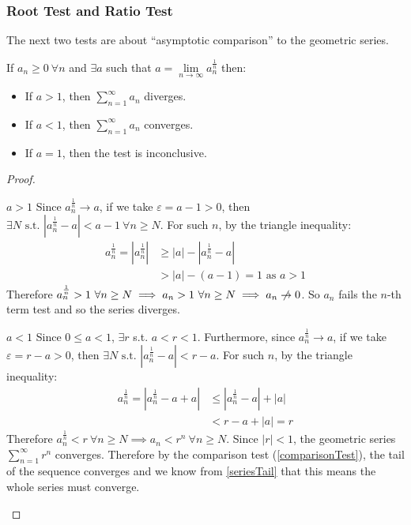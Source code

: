 \documentclass[../main.tex]{subfiles}
\begin{document}
\subsubsection{Root Test and Ratio Test}
The next two tests are about ``asymptotic comparison'' to the geometric series.
\begin{proposition}
  If $a_n \geq 0\ \forall n$ and $\exists a$ such that $a = \lim\limits_{n \to \infty} a^{\frac{1}{n}}_{n}$ then:
  \label{rootTest}
  \begin{itemize}
    \item If $a > 1$, then $\sum_{n = 1}^{\infty} a_n$ diverges.
    \item If $a < 1$, then $\sum_{n = 1}^{\infty} a_n$ converges.
    \item If $a = 1$, then the test is inconclusive.
  \end{itemize}
\end{proposition}
\begin{proof}
  \begin{proofcases}
    \begin{case}{$a > 1$}
      Since $a^{\frac{1}{n}}_{n} \to a$, if we take $\varepsilon = a - 1 > 0$, then $\exists N \text{ s.t. } |a^{\frac{1}{n}}_{n} - a| < a - 1\ \forall n \geq N$.
      For such $n$, by the triangle inequality:
      \begin{align*}
        a^{\frac{1}{n}}_{n} = |a^{\frac{1}{n}}_{n}| &\geq |a| - |a^{\frac{1}{n}}_{n} - a| \\
                                                    &> |a| - (a - 1) = 1 \text{ as $a > 1$}
      \end{align*}
      Therefore $a^{\frac{1}{n}}_{n} > 1\ \forall n \geq N \implies a_n > 1\ \forall n \geq N \implies a_n \centernot\to 0$.
      So $a_n$ fails the $n$-th term test and so the series diverges.
    \end{case}
    \begin{case}{$a < 1$}
      Since $0 \leq a < 1$, $\exists r$ s.t. $a < r < 1$.
      Furthermore, since $a^{\frac{1}{n}}_{n} \to a$, if we take $\varepsilon = r - a > 0$, then $\exists N \text{ s.t. } |a^{\frac{1}{n}}_{n} - a| < r - a$.
      For such $n$, by the triangle inequality:
      \begin{align*}
        a^{\frac{1}{n}}_{n} = |a^{\frac{1}{n}}_n - a + a| &\leq |a^{\frac{1}{n}}_{n} - a| + |a| \\
                                                          &< r - a + |a| = r
      \end{align*}
      Therefore $a^{\frac{1}{n}}_{n} < r\ \forall n \geq N \implies a_n < r^{n}\ \forall n \geq N$.
      Since $|r| < 1$, the geometric series $\sum_{n = 1}^{\infty} r^{n}$ converges.
      Therefore by the comparison test (\cref{comparisonTest}), the tail of the sequence converges and we know from \cref{seriesTail} that this means the whole series must converge.
    \end{case}
  \end{proofcases}
\end{proof}
\end{document}
